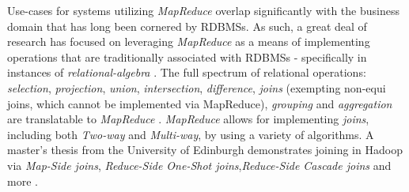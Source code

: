 Use-cases for systems utilizing \textit{MapReduce} overlap significantly with the business domain that has long been cornered by RDBMSs. As such, a great deal of research has focused on leveraging \textit{MapReduce} as a means of implementing operations that are traditionally associated with RDBMSs - specifically in instances of \textit{relational-algebra} \cite{mining2011,chandar2010}. The full spectrum of relational operations: \textit{selection}, \textit{projection}, \textit{union}, \textit{intersection}, \textit{difference}, \textit{joins} (exempting non-equi joins, which cannot be implemented via MapReduce), \textit{grouping} and \textit{aggregation} are translatable to \textit{MapReduce} \cite{mining2011}. \textit{MapReduce} allows for implementing \textit{joins}, including both \textit{Two-way} and \textit{Multi-way}, by using a variety of algorithms. A master’s thesis from the University of Edinburgh demonstrates joining in Hadoop via \textit{Map-Side joins}, \textit{Reduce-Side One-Shot joins},\textit{Reduce-Side Cascade joins} and more \cite{chandar2010}.